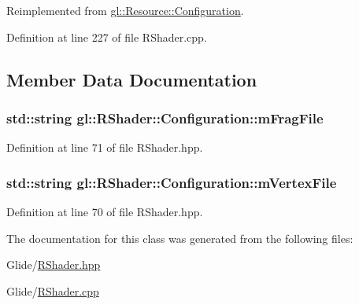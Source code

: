 Reimplemented from \hyperlink{classgl_1_1_resource_1_1_configuration_a4197a0f13d1481193872a7944ada4a92}{gl\-::\-Resource\-::\-Configuration}.



Definition at line 227 of file R\-Shader.\-cpp.



\subsection{Member Data Documentation}
\hypertarget{classgl_1_1_r_shader_1_1_configuration_aa59e52a59b0a293d951c6ab1af16189a}{
\subsubsection[{m\-Frag\-File}]{\setlength{\rightskip}{0pt plus 5cm}std\-::string gl\-::\-R\-Shader\-::\-Configuration\-::m\-Frag\-File}}\label{classgl_1_1_r_shader_1_1_configuration_aa59e52a59b0a293d951c6ab1af16189a}


Definition at line 71 of file R\-Shader.\-hpp.

\hypertarget{classgl_1_1_r_shader_1_1_configuration_aa9f93b7f474bb49fd0b94db1f77338d4}{
\subsubsection[{m\-Vertex\-File}]{\setlength{\rightskip}{0pt plus 5cm}std\-::string gl\-::\-R\-Shader\-::\-Configuration\-::m\-Vertex\-File}}\label{classgl_1_1_r_shader_1_1_configuration_aa9f93b7f474bb49fd0b94db1f77338d4}


Definition at line 70 of file R\-Shader.\-hpp.



The documentation for this class was generated from the following files\-:\begin{DoxyCompactItemize}
\item 
Glide/\hyperlink{_r_shader_8hpp}{R\-Shader.\-hpp}\item 
Glide/\hyperlink{_r_shader_8cpp}{R\-Shader.\-cpp}\end{DoxyCompactItemize}

